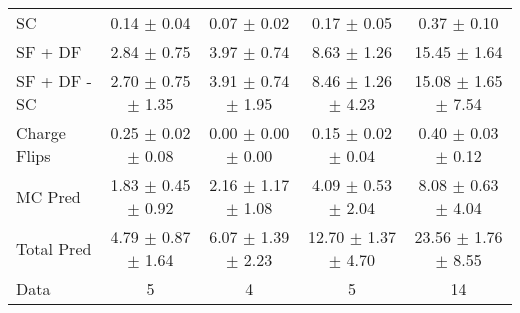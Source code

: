 \begin{tabular}{l|cccc}
                                 SC &  0.14 $\pm$  0.04 &  0.07 $\pm$  0.02 &  0.17 $\pm$  0.05 &  0.37 $\pm$  0.10 \\
                            SF + DF &  2.84 $\pm$  0.75 &  3.97 $\pm$  0.74 &  8.63 $\pm$  1.26 & 15.45 $\pm$  1.64 \\
\hline
                       SF + DF - SC &  2.70 $\pm$  0.75 $\pm$  1.35 &  3.91 $\pm$  0.74 $\pm$  1.95 &  8.46 $\pm$  1.26 $\pm$  4.23 & 15.08 $\pm$  1.65 $\pm$  7.54 \\
\hline\hline
                       Charge Flips &  0.25 $\pm$  0.02 $\pm$  0.08 &  0.00 $\pm$  0.00 $\pm$  0.00 &  0.15 $\pm$  0.02 $\pm$  0.04 &  0.40 $\pm$  0.03 $\pm$  0.12 \\
\hline
                            MC Pred &  1.83 $\pm$  0.45 $\pm$  0.92 &  2.16 $\pm$  1.17 $\pm$  1.08 &  4.09 $\pm$  0.53 $\pm$  2.04 &  8.08 $\pm$  0.63 $\pm$  4.04 \\
\hline
                         Total Pred &  4.79 $\pm$  0.87 $\pm$  1.64 &  6.07 $\pm$  1.39 $\pm$  2.23 & 12.70 $\pm$  1.37 $\pm$  4.70 & 23.56 $\pm$  1.76 $\pm$  8.55 \\
\hline\hline
                               Data &     5 &     4 &     5 &    14 \\
\hline\hline
\end{tabular}

